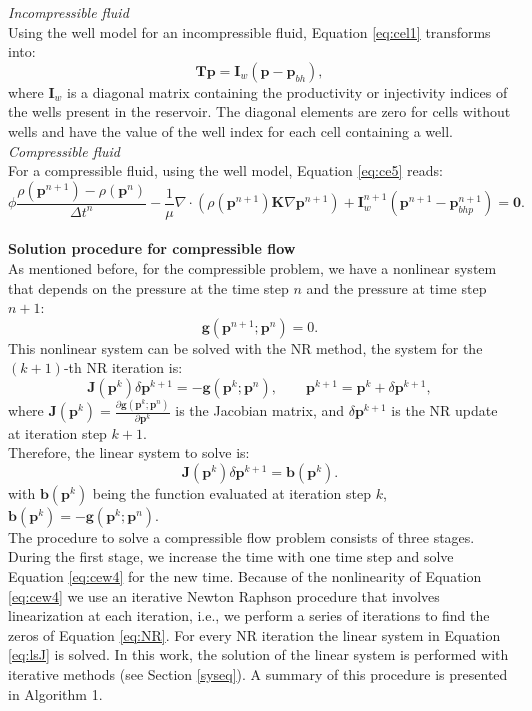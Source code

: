 \documentclass[review]{elsarticle}
\begin{document}
\emph{Incompressible fluid}\\
Using the well model for an incompressible fluid, Equation \eqref{eq:cel1} transforms into:
 \begin{equation}\label{eq:celw1}
\mathbf{T}\mathbf{p} = \mathbf{I}_w(\mathbf{p}-\mathbf{p}_{bh}),
\end{equation}
where $\mathbf{I}_w$ is a diagonal matrix containing the productivity or injectivity indices of the wells present in the reservoir. 
The diagonal elements are zero for cells without wells and have the value of the well index for each cell containing a well.\\
\emph{Compressible fluid}\\
For a compressible fluid, using the well model, Equation \eqref{eq:ce5} reads:
\begin{equation}\label{eq:cew4}
 {\phi}\frac{{\rho}(\mathbf{p}^{n+1})
 -{\rho}(\mathbf{p}^{n})}{\Delta t^n}
 -\frac{1}{\mu}\nabla \cdot ({\rho}(\mathbf{p}^{n+1}) 
 \mathbf{K}\nabla\mathbf{p}^{n+1})+\mathbf{I}_w^{n+1}(\mathbf{p}^{n+1}-\mathbf{p}_{bhp}^{n+1})=\mathbf{0}.
\end{equation}\\
\textbf{Solution procedure for compressible flow}\\
As mentioned before, for the compressible problem, we have a nonlinear system that depends on the pressure at the time step $n$ and the pressure at time step $n+1$:
\begin{equation}\label{eq:NR}
 \mathbf{g}(\mathbf{p}^{n+1};\mathbf{p}^n)=0.
\end{equation}
This nonlinear system can be solved with the NR method, the system for the $(k+1)$-th NR iteration is:
$$\mathbf{J}(\mathbf{p}^k)\delta\mathbf{p}^{k+1}=-\mathbf{g}(\mathbf{p}^k;\mathbf{p}^n),
\qquad \mathbf{p}^{k+1}=\mathbf{p}^k+\delta \mathbf{p}^{k+1},$$
where $\mathbf{J}(\mathbf{p}^k)=\frac{\partial \mathbf{g}(\mathbf{p}^k;\mathbf{p}^n)}{\partial \mathbf{p}^k}$ is the 
Jacobian matrix, and $\delta \mathbf{p}^{k+1}$ is the NR update at iteration step $k+1$.\\
Therefore, the linear system to solve is:\\
\begin{equation}\label{eq:lsJ}
\mathbf{J}(\mathbf{p}^k)\delta \mathbf{p}^{k+1}=\mathbf{b}(\mathbf{p}^k).
\end{equation}
with $\mathbf{b}(\mathbf{p}^k)$ being the function evaluated at iteration step $k$, $\mathbf{b}(\mathbf{p}^k)=-\mathbf{g}(\mathbf{p}^k;\mathbf{p}^n)$.\\
The procedure to solve a compressible flow problem consists of three stages. During the first stage, we increase the time with one time step and solve Equation \eqref{eq:cew4} for the new time. Because of the nonlinearity of Equation \eqref{eq:cew4} we use an iterative Newton Raphson procedure that involves linearization at each iteration, i.e., we perform a series of iterations to find the 
zeros of Equation \eqref{eq:NR}. For every NR iteration the linear system in Equation \eqref{eq:lsJ} is solved. 
In this work, the solution of the linear system is performed with iterative methods (see Section \ref{syseq}). A summary of 
this procedure is presented in Algorithm 1.
\end{document}
